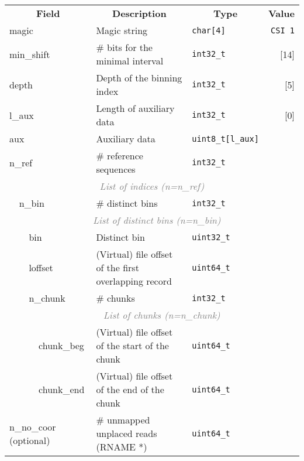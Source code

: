 \documentclass[10pt]{article}
\begin{document}
\begin{table}[h]
{\small
\begin{tabular}{|l|l|l|l|l|l|r|}
  \cline{1-7}
  \multicolumn{4}{|c|}{\bf Field} & \multicolumn{1}{c|}{\bf Description} & \multicolumn{1}{c|}{\bf Type} & \multicolumn{1}{c|}{\bf Value} \\\cline{1-7}
  \multicolumn{4}{|l|}{\sf magic} & Magic string & {\tt char[4]} & {\tt CSI\char92 1}\\\cline{1-7}
  \multicolumn{4}{|l|}{\sf min\_shift} & \# bits for the minimal interval & {\tt int32\_t} & [14]\\\cline{1-7}
  \multicolumn{4}{|l|}{\sf depth} & Depth of the binning index & {\tt int32\_t} & [5]\\\cline{1-7}
  \multicolumn{4}{|l|}{\sf l\_aux} & Length of auxiliary data & {\tt int32\_t} & [0]\\\cline{1-7}
  \multicolumn{4}{|l|}{\sf aux} & Auxiliary data & {\tt uint8\_t[l\_aux]} & \\\cline{1-7}
  \multicolumn{4}{|l|}{\sf n\_ref} & \# reference sequences & {\tt int32\_t} & \\\cline{1-7}
  \multicolumn{7}{|c|}{\textcolor{gray}{\it List of indices (n=n\_ref)}} \\\cline{2-7}
  & \multicolumn{3}{l|}{\sf n\_bin} & \# distinct bins & {\tt int32\_t} & \\\cline{2-7}
  & \multicolumn{6}{c|}{\textcolor{gray}{\it List of distinct bins (n=n\_bin)}} \\\cline{3-7}
  & & \multicolumn{2}{l|}{\sf bin} & Distinct bin & {\tt uint32\_t} & \\\cline{3-7}
  & & \multicolumn{2}{l|}{\sf loffset} & (Virtual) file offset of the first overlapping record & {\tt uint64\_t} & \\\cline{3-7}
  & & \multicolumn{2}{l|}{\sf n\_chunk} & \# chunks & {\tt int32\_t} & \\\cline{3-7}
  & & \multicolumn{5}{c|}{\textcolor{gray}{\it List of chunks (n=n\_chunk)}} \\\cline{4-7}
  & & & {\sf chunk\_beg} & (Virtual) file offset of the start of the chunk & {\tt uint64\_t} & \\\cline{4-7}
  & & & {\sf chunk\_end} & (Virtual) file offset of the end of the chunk & {\tt uint64\_t} & \\\cline{1-7}
  \multicolumn{4}{|l|}{{\sf n\_no\_coor} (optional)} & \# unmapped unplaced reads ({\sf RNAME} *) & {\tt uint64\_t} & \\\cline{1-7}
\end{tabular}}
\end{table}
\end{document}
